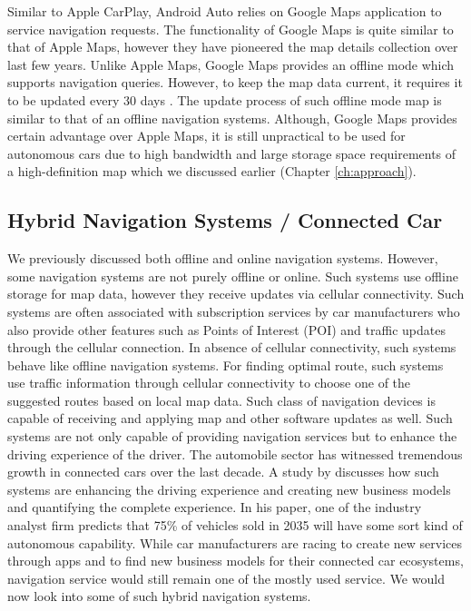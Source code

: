 Similar to Apple CarPlay, Android Auto relies on Google Maps \cite{googlemaps} application to service navigation requests. The functionality of Google Maps is quite similar to that of Apple Maps, however they have pioneered the map details collection over last few years. Unlike Apple Maps, Google Maps provides an offline mode which supports navigation queries. However, to keep the map data current, it requires it to be updated every 30 days \cite{maps30expire}. The update process of such offline mode map is similar to that of an offline navigation systems. Although, Google Maps provides certain advantage over Apple Maps, it is still unpractical to be used for autonomous cars due to high bandwidth and large storage space requirements of a high-definition map which we discussed earlier (Chapter \ref{ch:approach}). 

\subsection{Hybrid Navigation Systems / Connected Car}
We previously discussed both offline and online navigation systems. However, some navigation systems are not purely offline or online. Such systems use offline storage for map data, however they receive updates via cellular connectivity. Such systems are often associated with subscription services by car manufacturers who also provide other features such as Points of Interest (POI) and traffic updates through the cellular connection. In absence of cellular connectivity, such systems behave like offline navigation systems. For finding optimal route, such systems use traffic information through cellular connectivity to choose one of the suggested routes based on local map data. Such class of navigation devices is capable of receiving and applying map and other software updates as well. Such systems are not only capable of providing navigation services but to enhance the driving experience of the driver. The automobile sector has witnessed tremendous growth in connected cars over the last decade. A study by \citet{swan2015connected} discusses how such systems are enhancing the driving experience and creating new business models and quantifying the complete experience. In his paper, one of the industry analyst firm predicts that 75\% of vehicles sold in 2035 will have some sort kind of autonomous capability. While car manufacturers are racing to create new services through apps and to find new business models for their connected car ecosystems, navigation service would still remain one of the mostly used service. We would now look into some of such hybrid navigation systems.
 
